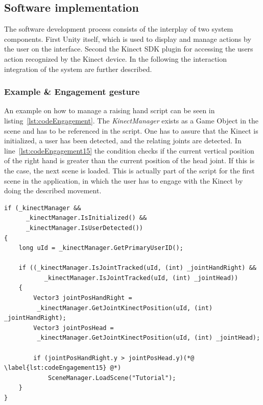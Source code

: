 \subsection{Software implementation}
The software development process consists of the interplay of two system components. First Unity itself, which is used to display and manage actions by the user on the interface. Second the Kinect SDK plugin for accessing the users action recognized by the Kinect device. In the following the interaction integration of the system are further described.

\subsubsection{Example \& Engagement gesture}
An example on how to manage a raising hand script can be seen in listing~\ref{lst:codeEngagement}. The \textit{KinectManager} exists as a Game Object in the scene and has to be referenced in the script. One has to assure that the Kinect is initialized, a user has been detected, and the relating joints are detected. In line~\ref{lst:codeEngagement15} the condition checks if the current vertical position of the right hand is greater than the current position of the head joint. If this is the case, the next scene is loaded. This is actually part of the script for the first scene in the application, in which the user has to engage with the Kinect by doing the described movement.

\begin{lstlisting}[caption=C$^\sharp$ example code for tracking a raising hand, label=lst:codeEngagement]
if (_kinectManager && 
	  _kinectManager.IsInitialized() && 
	  _kinectManager.IsUserDetected())
{
	long uId = _kinectManager.GetPrimaryUserID();

	if ((_kinectManager.IsJointTracked(uId, (int) _jointHandRight) && 
		   _kinectManager.IsJointTracked(uId, (int) _jointHead))
	{
		Vector3 jointPosHandRight = 
		 _kinectManager.GetJointKinectPosition(uId, (int) _jointHandRight);
		Vector3 jointPosHead = 
		 _kinectManager.GetJointKinectPosition(uId, (int) _jointHead);			

		if (jointPosHandRight.y > jointPosHead.y)(*@ \label{lst:codeEngagement15} @*)
			SceneManager.LoadScene("Tutorial");
	}
}
\end{lstlisting}

